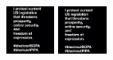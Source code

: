 \documentclass{acm_proc_article-sp}
\newcommand{\thumbheight}{16mm}
\newenvironment{thumbsequence}{}{\makebox[4mm]{}}
\begin{document}
\begin{figure}
\begin{centering}
	\begin{thumbsequence}
		\includegraphics[height=\thumbheight]{resources/sopa/looseduplicate1.jpg}
		\includegraphics[height=\thumbheight]{resources/sopa/looseduplicate2.jpg}

\end{thumbsequence}
\end{centering}
\end{figure}
\end{document}
